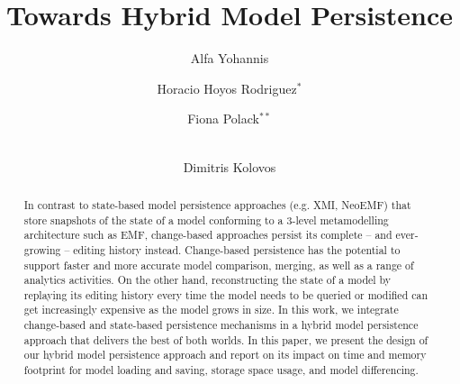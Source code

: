 \documentclass{llncs}
\begin{document}
\renewcommand{\thelstlisting}{\arabic{lstlisting}}
\renewcommand{\labelitemi}{$\bullet$}
\newcommand{\dk}[1]{\textbf{[DK: #1]}}

\title{Towards Hybrid Model Persistence}
%
%
\author{
Alfa Yohannis \and Horacio Hoyos Rodriguez$^{*}$ \and Fiona Polack$^{**}$ \and \\ Dimitris Kolovos
}
%
%
%


\maketitle      %
\begin{abstract}
In contrast to state-based model persistence approaches (e.g. XMI, NeoEMF) that store snapshots of the state of a model conforming to a 3-level metamodelling architecture such as EMF, change-based approaches persist its complete -- and ever-growing -- editing history instead. Change-based persistence has the potential to support faster and more accurate model comparison, merging, as well as a range of analytics activities. On the other hand, reconstructing the state of a model by replaying its editing history every time the model needs to be queried or modified can get increasingly expensive as the model grows in size. In this work, we integrate change-based and state-based persistence mechanisms in a hybrid model persistence approach that delivers the best of both worlds. In this paper, we present the design of our hybrid model persistence approach and report on its impact on time and memory footprint for model loading and saving, storage space usage, and model differencing.
\end{abstract}
\end{document}
